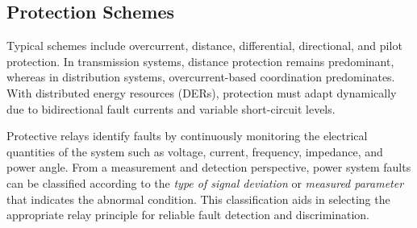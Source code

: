 \subsection{Protection Schemes}
Typical schemes include overcurrent, distance, differential, directional, and pilot protection. In transmission systems, distance protection remains predominant, whereas in distribution systems, overcurrent-based coordination predominates. With distributed energy resources (DERs), protection must adapt dynamically due to bidirectional fault currents and variable short-circuit levels.

Protective relays identify faults by continuously monitoring the electrical quantities of the system such as voltage, current, frequency, impedance, and power angle.
From a measurement and detection perspective, power system faults can be classified according to the \textit{type of signal deviation} or \textit{measured parameter} that indicates the abnormal condition.
This classification aids in selecting the appropriate relay principle for reliable fault detection and discrimination.

